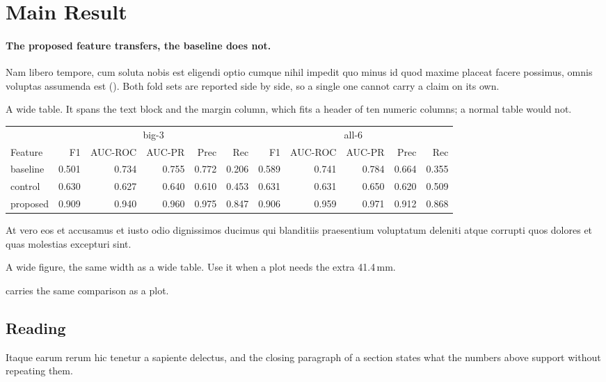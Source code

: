 \section{Main Result}
\label{sec:exp-main}

\paragraph{The proposed feature transfers, the baseline does not.}
Nam libero tempore, cum soluta nobis est eligendi optio cumque nihil impedit quo minus id quod maxime placeat facere possimus, omnis voluptas assumenda est ().
Both fold sets are reported side by side, so a single one cannot carry a claim on its own.

\begin{widetable}[tb]
  \footnotesize
  \setlength{\tabcolsep}{4pt}
  \caption[A wide table spanning text and margin]{A wide table. It spans the text block and the margin column, which fits a header of ten numeric columns; a normal table would not.}
  \label{tab:exp-headline}
  \begin{tabular}{lrrrrrrrrrr}
    \toprule
    & \multicolumn{5}{c}{big-3} & \multicolumn{5}{c}{all-6} \\
    \cmidrule(lr){2-6} \cmidrule(lr){7-11}
    Feature & F1 & AUC-ROC & AUC-PR & Prec & Rec & F1 & AUC-ROC & AUC-PR & Prec & Rec \\
    \midrule
    baseline  & 0.501 & 0.734 & 0.755 & 0.772 & 0.206 & 0.589 & 0.741 & 0.784 & 0.664 & 0.355 \\
    control   & 0.630 & 0.627 & 0.640 & 0.610 & 0.453 & 0.631 & 0.631 & 0.650 & 0.620 & 0.509 \\
    proposed  & 0.909 & 0.940 & 0.960 & 0.975 & 0.847 & 0.906 & 0.959 & 0.971 & 0.912 & 0.868 \\
    \bottomrule
  \end{tabular}
\end{widetable}

At vero eos et accusamus et iusto odio dignissimos ducimus qui blanditiis praesentium voluptatum deleniti atque corrupti quos dolores et quas molestias excepturi sint.

\begin{widefigure}[tb]
  \centering
  \caption[A wide figure spanning text and margin]{A wide figure, the same width as a wide table. Use it when a plot needs the extra 41.4\,mm.}
  \label{fig:exp-wide}
\end{widefigure}

 carries the same comparison as a plot.

\subsection{Reading}
\label{sec:exp-main-reading}

Itaque earum rerum hic tenetur a sapiente delectus, and the closing paragraph of a section states what the numbers above support without repeating them.
